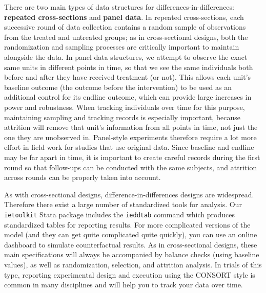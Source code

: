 There are two main types of data structures for differences-in-differences:
\textbf{repeated cross-sections} and \textbf{panel data}.
In repeated cross-sections, each successive round of data collection contains a random sample
of observations from the treated and untreated groups;
as in cross-sectional designs, both the randomization and sampling processes
are critically important to maintain alongside the data.
In panel data structures, we attempt to observe the exact same units
in different points in time, so that we see the same individuals
both before and after they have received treatment (or not).
This allows each unit's baseline outcome (the outcome before the intervention) to be used
as an additional control for its endline outcome,
which can provide large increases in power and robustness.
When tracking individuals over time for this purpose,
maintaining sampling and tracking records is especially important,
because attrition will remove that unit's information
from all points in time, not just the one they are unobserved in.
Panel-style experiments therefore require a lot more effort in field work
for studies that use original data.\cite{torres2007}
Since baseline and endline may be far apart in time,
it is important to create careful records during the first round
so that follow-ups can be conducted with the same subjects,
and attrition across rounds can be properly taken into account.

As with cross-sectional designs, difference-in-differences designs are widespread.
Therefore there exist a large number of standardized tools for analysis.
Our \texttt{ietoolkit} Stata package includes the \texttt{ieddtab} command
which produces standardized tables for reporting results.
For more complicated versions of the model
(and they can get quite complicated quite quickly),
you can use an online dashboard to simulate counterfactual results.
As in cross-sectional designs, these main specifications
will always be accompanied by balance checks (using baseline values),
as well as randomization, selection, and attrition analysis.
In trials of this type, reporting experimental design and execution
using the CONSORT style is common in many disciplines
and will help you to track your data over time.\cite{schulz2010consort}


